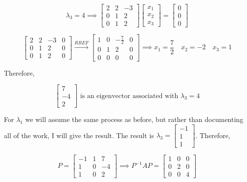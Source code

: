 \documentclass{report}
\begin{document}
$$
\lambda_3 = 4 \implies \begin{bmatrix} 2 & 2 & -3 \\ 0 & 1 & 2 \\ 0 & 1 & 2 \end{bmatrix} \begin{bmatrix} x_1 \\ x_2 \\ x_3 \end{bmatrix} = \begin{bmatrix} 0 \\ 0 \\ 0 \end{bmatrix}
$$

$$
\begin{bmatrix} 2 & 2 & -3 & 0 \\ 0 & 1 & 2 & 0 \\ 0 & 1 & 2 & 0 \end{bmatrix} \xrightarrow{RREF} \begin{bmatrix} 1 & 0 & -\frac{7}{2} & 0 \\ 0 & 1 & 2 & 0 \\ 0 & 0 & 0 & 0 \end{bmatrix} \implies x_1 = \frac{7}{2} \quad x_2 = -2 \quad x_3 = 1 
$$

\noindent Therefore, 

$$
\begin{bmatrix} 7 \\ -4 \\ 2 \end{bmatrix} \text{ is an eigenvector associated with } \lambda_3 = 4 
$$

For $\lambda_1$ we will assume the same process as before, but rather than documenting all of the work, I will give the result. The result is $\lambda_3 = \begin{bmatrix} -1 \\ 1 \\ 1 \end{bmatrix}$. Therefore,

$$
P = \begin{bmatrix} -1 & 1 & 7 \\ 1 & 0 & -4 \\ 1 & 0 & 2 \end{bmatrix} \implies P^{-1} AP = \begin{bmatrix} 1 & 0 & 0 \\ 0 & 2 & 0 \\ 0 & 0 & 4 \end{bmatrix} 
$$
\end{document}
